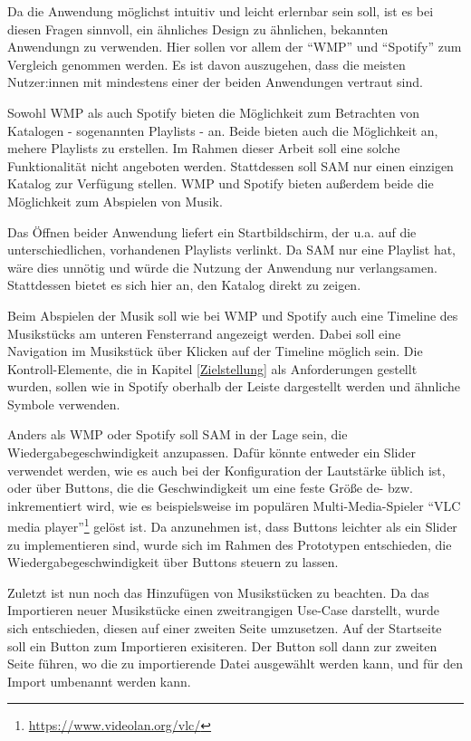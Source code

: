 Da die Anwendung möglichst intuitiv und leicht erlernbar sein soll, ist es bei diesen Fragen sinnvoll, ein ähnliches Design zu ähnlichen, bekannten Anwendungn zu verwenden.
Hier sollen vor allem der \enquote{\ac{WMP}} und \enquote{Spotify} zum Vergleich genommen werden.
Es ist davon auszugehen, dass die meisten Nutzer:innen mit mindestens einer der beiden Anwendungen vertraut sind.

Sowohl \ac{WMP} als auch Spotify bieten die Möglichkeit zum Betrachten von Katalogen - sogenannten Playlists - an.
Beide bieten auch die Möglichkeit an, mehere Playlists zu erstellen.
Im Rahmen dieser Arbeit soll eine solche Funktionalität nicht angeboten werden.
Stattdessen soll \ac{SAM} nur einen einzigen Katalog zur Verfügung stellen.
\ac{WMP} und Spotify bieten außerdem beide die Möglichkeit zum Abspielen von Musik.

Das Öffnen beider Anwendung liefert ein Startbildschirm, der u.a. auf die unterschiedlichen, vorhandenen Playlists verlinkt.
Da \ac{SAM} nur eine Playlist hat, wäre dies unnötig und würde die Nutzung der Anwendung nur verlangsamen.
Stattdessen bietet es sich hier an, den Katalog direkt zu zeigen.

Beim Abspielen der Musik soll wie bei \ac{WMP} und Spotify auch eine Timeline des Musikstücks am unteren Fensterrand angezeigt werden.
Dabei soll eine Navigation im Musikstück über Klicken auf der Timeline möglich sein.
Die Kontroll-Elemente, die in Kapitel \ref{Zielstellung} als Anforderungen gestellt wurden, sollen wie in Spotify oberhalb der Leiste dargestellt werden und ähnliche Symbole verwenden.

Anders als \ac{WMP} oder Spotify soll \ac{SAM} in der Lage sein, die Wiedergabegeschwindigkeit anzupassen.
Dafür könnte entweder ein Slider verwendet werden, wie es auch bei der Konfiguration der Lautstärke üblich ist, oder über Buttons, die die Geschwindigkeit um eine feste Größe de- bzw. inkrementiert wird, wie es beispielsweise im populären Multi-Media-Spieler \enquote{VLC media player}\footnote{\url{https://www.videolan.org/vlc/}} gelöst ist.
Da anzunehmen ist, dass Buttons leichter als ein Slider zu implementieren sind, wurde sich im Rahmen des Prototypen entschieden, die Wiedergabegeschwindigkeit über Buttons steuern zu lassen.

Zuletzt ist nun noch das Hinzufügen von Musikstücken zu beachten.
Da das Importieren neuer Musikstücke einen zweitrangigen Use-Case darstellt, wurde sich entschieden, diesen auf einer zweiten Seite umzusetzen.
Auf der Startseite soll ein Button zum Importieren exisiteren.
Der Button soll dann zur zweiten Seite führen, wo die zu importierende Datei ausgewählt werden kann, und für den Import umbenannt werden kann.

